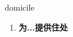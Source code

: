 
\begin{frame}
{\huge domicile}
\begin{center}
\begin{enumerate}\Large
  \item \textbf{为...提供住处}
\end{enumerate}
\end{center}
\end{frame}
